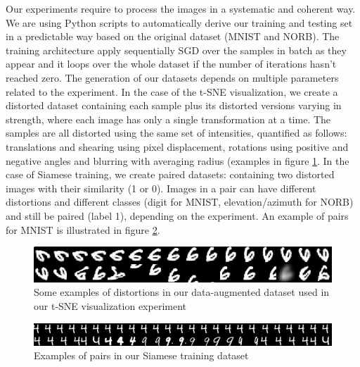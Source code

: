 \documentclass[a4paper,12pt]{report}
\begin{document}
Our experiments require to process the images in a systematic and coherent way.
We are using Python scripts to automatically derive our training and testing set in a predictable way based on the original dataset (MNIST and NORB).
The training architecture apply sequentially SGD over the samples in batch as they appear and it loops over the whole dataset if the number of iterations hasn't reached zero.
The generation of our datasets depends on multiple parameters related to the experiment.
In the case of the t-SNE visualization, we create a distorted dataset containing each sample plus its distorted versions varying in strength, where each image has only a single transformation at a time.
The samples are all distorted using the same set of intensities, quantified as follows: translations and shearing using pixel displacement, rotations using positive and negative angles and blurring with averaging radius (examples in figure \ref{fig:mnist_transfo_tsne}.
In the case of Siamese training, we create paired datasets: containing two distorted images with their similarity (1 or 0).
Images in a pair can have different distortions and different classes (digit for MNIST, elevation/azimuth for NORB) and still be paired (label 1), depending on the experiment.
An example of pairs for MNIST is illustrated in figure \ref{fig:mnist_pairs}.

\begin{figure}[t]
    \begin{center}
        \includegraphics{thesis_figures/mnist_transfo_tsne.jpg}
    \end{center}
    \caption{Some examples of distortions in our data-augmented dataset used in our t-SNE visualization experiment}
    \label{fig:mnist_transfo_tsne}
\end{figure}

\begin{figure}[t]
    \begin{center}
        \includegraphics{thesis_figures/mnist_pairs.jpg}
    \end{center}
    \caption{Examples of pairs in our Siamese training dataset}
    \label{fig:mnist_pairs}
\end{figure}
\end{document}
